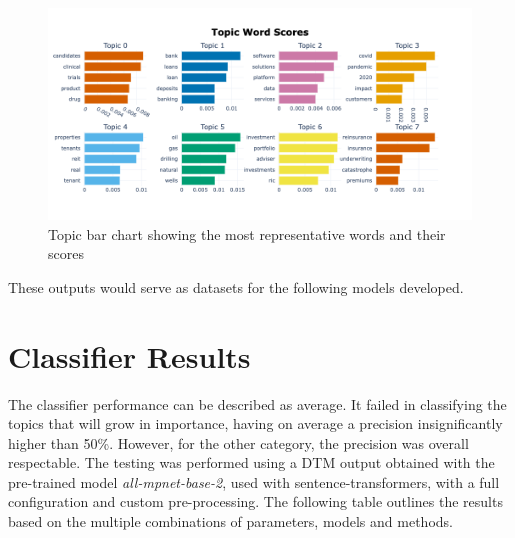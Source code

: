 \documentclass[12pt,MSc,a4paper,oneside]{muthesis}
\begin{document}
    \begin{figure}[h]
      \centering
      \includegraphics[scale=0.5]{topic barchart flair 1-3.png}
      \caption{Topic bar chart showing the most representative words and their scores}
      \label{barchart}
    \end{figure}

    These outputs would serve as datasets for the following models developed.
    \clearpage

    \section{Classifier Results}
    The classifier performance can be described as average. It failed in classifying the topics that will grow in importance, having on average a precision insignificantly higher than 50\%. However, for the other category, the precision was overall respectable. The testing was performed using a DTM output obtained with the pre-trained model \textit{all-mpnet-base-2}, used with sentence-transformers, with a full configuration and custom pre-processing. The following table outlines the results based on the multiple combinations of parameters, models and methods.
\end{document}
